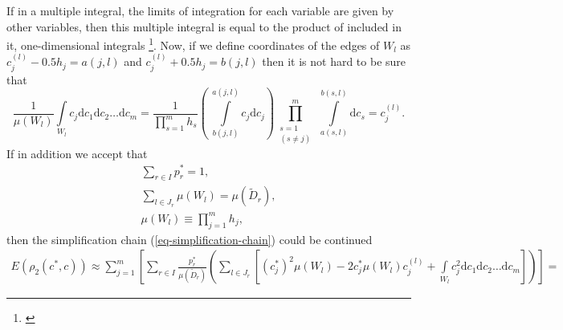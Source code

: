 If in a multiple integral, the limits of integration for each variable are given by other variables, then this multiple integral is equal to the product of included in it, one-dimensional integrals \footnote{\cite{stewart_2008_int}}. Now, if we define coordinates of the edges of $W_{l}$ as $c_{j}^{(l)} - 0.5h_{j} = a(j,l)$ and $c_{j}^{(l)} + 0.5h_{j} = b(j,l)$ then it is not hard to be sure that 
\begin{equation}
\frac{1}{\mu(W_{l})} \int\limits_{W_l} c_{j} \mathrm{d} c_{1} \mathrm{d} c_{2} \ldots  \mathrm{d} c_{m} 
	= \dfrac{1}{\prod\limits_{s=1}^{m}h_{s}}
	\left( \  \int\limits_{b(j,l)}^{a(j,l)} c_{j}  \mathrm{d} c_{j}\right) 
	\prod_{\substack{s=1\\ (s\ne j)}}^m \ 
	\int\limits_{a(s,l)}^{b(s,l)} \!  \mathrm{d} c_{s} 
	= c_{j}^{(l)}.
\end{equation}
If in addition we accept that
\begin{gather}
\sum\limits_{r \in I} p_{r}^{*} =1, \\
\sum\limits_{l \in J_{r}} \mu(W_{l}) =\mu(\tilde{D}_{r}), \\
\mu(W_{l}) \equiv \prod\limits_{j=1}^{m}h_{j},
\end{gather}
then the simplification chain (\ref{eq-simplification-chain}) could be continued
\begin{gather}
\nonumber
E(\rho_{2}(c^{*},c)) \approx \sum\limits_{j=1}^{m}  \left[ \sum\limits_{r \in I} \frac{p_{r}^{*}}{\mu(\tilde{D}_{r})} \left( \sum\limits_{l \in J_{r}} \left[ (c_{j}^{*})^{2} \mu(W_{l}) - 2c_{j}^{*} \mu(W_{l}) c_{j}^{(l)} + \int\limits_{W_{l}} c_{j}^{2} \mathrm{d}c_{1} \mathrm{d}c_{2} \dots \mathrm{d}c_{m} \right] \right) \right] = 
\end{gather}
